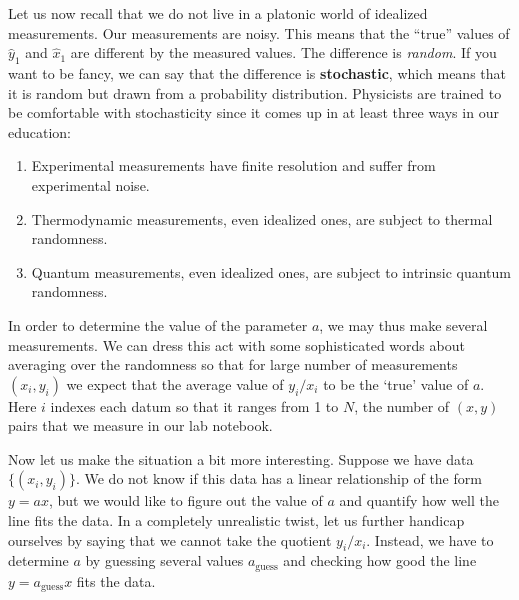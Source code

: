 \documentclass[12pt]{article}
\begin{document}

Let us now recall that we do not live in a platonic world of idealized measurements. Our measurements are noisy. This means that the ``true'' values of $\hat y_1$ and $\hat x_1$ are different by the measured values. The difference is \emph{random}. If you want to be fancy, we can say that the difference is \textbf{stochastic}, which means that it is random but drawn from a probability distribution. Physicists are trained to be comfortable with stochasticity since it comes up in at least three ways in our education:
\begin{enumerate}
    \item Experimental measurements have finite resolution and suffer from experimental noise. 
    \item Thermodynamic measurements, even idealized ones, are subject to thermal randomness.
    \item Quantum measurements, even idealized ones, are subject to intrinsic quantum randomness.
\end{enumerate}

In order to determine the value of the parameter $a$, we may thus make several measurements. We can dress this act with some sophisticated words about averaging over the randomness so that for large number of measurements $(x_i, y_i)$ we expect that the average value of $y_i/x_i$ to be the `true' value of $a$. Here $i$ indexes each datum so that it ranges from 1 to $N$, the number of $(x,y)$ pairs that we measure in our lab notebook.

Now let us make the situation a bit more interesting. Suppose we have data $\{(x_i, y_i)\}$. We do not know if this data has a linear relationship of the form $y=ax$, but we would like to figure out the value of $a$ and quantify how well the line fits the data. In a completely unrealistic twist, let us further handicap ourselves by saying that we cannot take the quotient $y_i/x_i$. Instead, we have to determine $a$ by guessing several values $a_\text{guess}$ and checking how good the line $y=a_\text{guess} x$ fits the data. 
\end{document}
